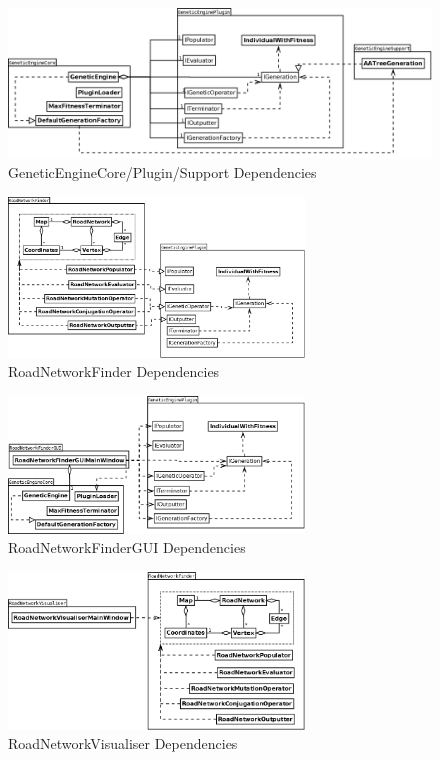 \begin{figure}[ht!]
 \caption{GeneticEngineCore/Plugin/Support Dependencies}
 \centering
 \includegraphics[width=\textwidth]{../GeneticEngineCorePluginSupport.png}
\end{figure}

\begin{figure}[ht!]
 \caption{RoadNetworkFinder Dependencies}
 \centering
 \includegraphics[width=0.7\textwidth]{../RoadNetworkFinder.png}
\end{figure}

\begin{figure}[ht!]
 \caption{RoadNetworkFinderGUI Dependencies}
 \centering
 \includegraphics[width=0.7\textwidth]{../RoadNetworkFinderGUI.png}
\end{figure}

\begin{figure}[ht!]
 \caption{RoadNetworkVisualiser Dependencies}
 \centering
 \includegraphics[width=0.7\textwidth]{../RoadNetworkVisualiser.png}
\end{figure}

